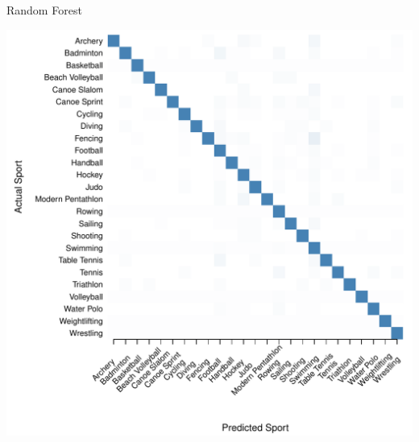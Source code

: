\documentclass[landscape, paperwidth=42in, paperheight=36in,
fontscale=.35, margin=1in]{baposter}
\begin{document}
\begin{poster}
{\begin{center}
\begin{minipage}{0.45\textwidth}
\begin{center}
    \end{center}
  \end{minipage}



    Random Forest \\
  \begin{minipage}{0.45\textwidth}
    \begin{center}
      \includegraphics[scale=0.27]{../graphics/sportRF-trn.pdf}
    \end{center}
  \end{minipage}
  \hspace{0.05\textwidth}
  \begin{minipage}{0.45\textwidth}
    \begin{center}

\end{center}
\end{minipage}
\end{center}}
\end{poster}
\end{document}
